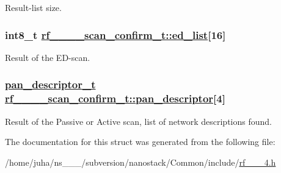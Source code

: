 Result-list size. \hypertarget{structrf__802__15__4__scan__confirm__t_7103a6c3f7f6804e8d4764bb8bf7aada}{
\subsubsection[ed\_\-list]{\setlength{\rightskip}{0pt plus 5cm}int8\_\-t \hyperlink{structrf__802__15__4__scan__confirm__t_7103a6c3f7f6804e8d4764bb8bf7aada}{rf\_\_\_\_\-scan\_\-confirm\_\-t::ed\_\-list}\mbox{[}16\mbox{]}}}
\label{structrf__802__15__4__scan__confirm__t_7103a6c3f7f6804e8d4764bb8bf7aada}


Result of the ED-scan. \hypertarget{structrf__802__15__4__scan__confirm__t_54212a819202dc21a64ea73e630de2bc}{
\subsubsection[pan\_\-descriptor]{\setlength{\rightskip}{0pt plus 5cm}\hyperlink{structpan__descriptor__t}{pan\_\-descriptor\_\-t} \hyperlink{structrf__802__15__4__scan__confirm__t_54212a819202dc21a64ea73e630de2bc}{rf\_\_\_\_\-scan\_\-confirm\_\-t::pan\_\-descriptor}\mbox{[}4\mbox{]}}}
\label{structrf__802__15__4__scan__confirm__t_54212a819202dc21a64ea73e630de2bc}


Result of the Passive or Active scan, list of network descriptions found. 

The documentation for this struct was generated from the following file:\begin{CompactItemize}
\item 
/home/juha/ns\_\_\_/subversion/nanostack/Common/include/\hyperlink{rf__802__15__4_8h}{rf\_\_\_\-4.h}\end{CompactItemize}

